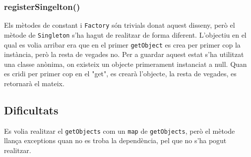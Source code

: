 \subsubsection{registerSingelton()}
Els mètodes de constant i  \texttt{Factory} són trivials donat aquest disseny, però el mètode de \texttt{Singleton} s'ha
hagut de realitzar de forma diferent. L'objectiu en el qual es volia arribar era que en el primer \texttt{getObject} es
crea per primer cop la instància, però la resta de vegades no. Per a guardar aquest estat s'ha utilitzat una classe anònima,
on existeix un objecte primerament instanciat a null. Quan es cridi per primer cop en el "get", es crearà l'objecte, la resta
de vegades, es retornarà el mateix.
\subsection{Dificultats}
Es volia realitzar el \texttt{getObjects} com un \texttt{map} de \texttt{getObjects}, però el mètode llança exceptions
quan no es troba la dependència, pel que no s'ha pogut realitzar.


